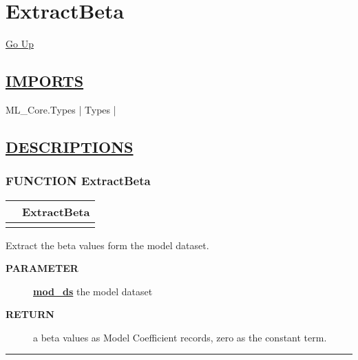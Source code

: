 \chapter*{\color{headfile}
ExtractBeta
}
\hypertarget{ecldoc:toc:ExtractBeta}{}
\hyperlink{ecldoc:toc:root}{Go Up}

\section*{\underline{\textsf{IMPORTS}}}
\begin{doublespace}
{\large
ML\_Core.Types |
Types |
}
\end{doublespace}

\section*{\underline{\textsf{DESCRIPTIONS}}}
\subsection*{\textsf{\colorbox{headtoc}{\color{white} FUNCTION}
ExtractBeta}}

\hypertarget{ecldoc:extractbeta}{}

{\renewcommand{\arraystretch}{1.5}
\begin{tabularx}{\textwidth}{|>{\raggedright\arraybackslash}l|X|}
\hline
\hspace{0pt}\mytexttt{\color{red} } & \textbf{ExtractBeta} \\
\hline
\multicolumn{2}{|>{\raggedright\arraybackslash}X|}{\hspace{0pt}\mytexttt{\color{param} (DATASET(Core\_Types.Layout\_Model) mod\_ds)}} \\
\hline
\end{tabularx}
}

\par
Extract the beta values form the model dataset.

\par
\begin{description}
\item [\colorbox{tagtype}{\color{white} \textbf{\textsf{PARAMETER}}}] \textbf{\underline{mod\_ds}} the model dataset
\item [\colorbox{tagtype}{\color{white} \textbf{\textsf{RETURN}}}] \textbf{\underline{}} a beta values as Model Coefficient records, zero as the constant term.
\end{description}

\rule{\linewidth}{0.5pt}
